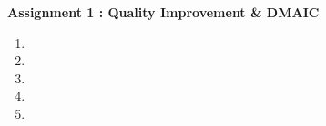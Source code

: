 \documentclass[a4 paper, 12pt]{report}
\begin{document}
\begin{center}
    \large \textbf{Assignment 1 : Quality Improvement \& DMAIC}
\end{center}
    

\begin{enumerate}
    
    \item 
    
    \item 
    
    \item     

    \item 
        
    \item 

\end{enumerate}
\end{document}
